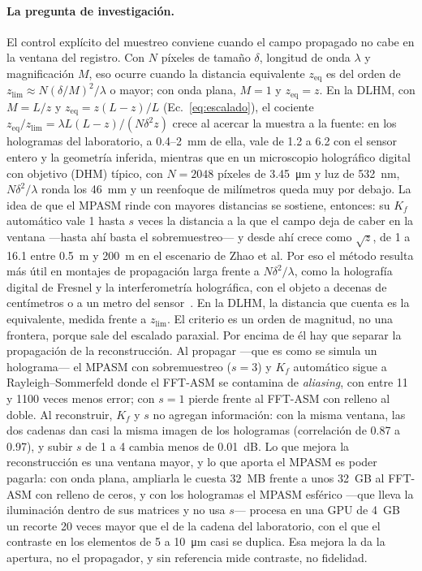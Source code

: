 \paragraph{La pregunta de investigación.} El control explícito del muestreo
conviene cuando el campo propagado no cabe en la ventana del registro. Con $N$
píxeles de tamaño $\delta$, longitud de onda $\lambda$ y magnificación $M$, eso
ocurre cuando la distancia equivalente $z_\mathrm{eq}$ es del orden de
$z_\mathrm{lim} \approx N(\delta/M)^2/\lambda$ o mayor; con onda plana, $M = 1$
y $z_\mathrm{eq} = z$. En la DLHM, con $M = L/z$ y $z_\mathrm{eq} = z(L-z)/L$
(Ec.~\eqref{eq:escalado}), el cociente
$z_\mathrm{eq}/z_\mathrm{lim} = \lambda L(L-z)/(N\delta^2 z)$ crece al acercar
la muestra a la fuente: en los hologramas del laboratorio, a 0.4--2~mm de ella,
vale de 1.2 a 6.2 con el sensor entero y la geometría inferida, mientras que en
un microscopio holográfico digital con objetivo (DHM) típico, con
$N = 2048$ píxeles de \SI{3.45}{\micro\metre} y luz de \SI{532}{nm},
$N\delta^2/\lambda$ ronda los 46~mm y un reenfoque de milímetros queda muy por
debajo. La idea de que el MPASM rinde con mayores distancias se
sostiene, entonces: su $K_f$ automático vale 1 hasta $s$ veces la distancia a
la que el campo deja de caber en la ventana ---hasta ahí basta el
sobremuestreo--- y desde ahí crece como $\sqrt{z}$, de 1 a 16.1 entre
\SI{0.5}{m} y
\SI{200}{m} en el escenario de Zhao et al. Por eso el método resulta más útil
en montajes de propagación larga frente a $N\delta^2/\lambda$, como la
holografía digital de Fresnel y la interferometría holográfica, con el objeto
a decenas de centímetros o a un metro del sensor~\cite{schnars1994,
schnars2005}. En la DLHM, la distancia que cuenta es la equivalente, medida
frente a $z_\mathrm{lim}$. El criterio es un orden de magnitud, no una frontera, porque sale del escalado
paraxial. Por encima de él hay que
separar la propagación de la reconstrucción. Al propagar ---que es como se
simula un holograma--- el MPASM con sobremuestreo ($s = 3$) y $K_f$ automático
sigue a Rayleigh--Sommerfeld donde el FFT-ASM se contamina de \emph{aliasing}, con
entre 11 y 1100 veces menos error; con $s = 1$ pierde frente al FFT-ASM con
relleno al doble. Al reconstruir, $K_f$ y $s$ no agregan información: con la
misma ventana, las dos cadenas dan casi la misma imagen de los hologramas
(correlación de 0.87 a 0.97), y subir $s$ de 1 a 4 cambia menos de 0.01~dB. Lo
que mejora la reconstrucción es una ventana mayor, y lo que aporta el MPASM es
poder pagarla: con onda plana, ampliarla le cuesta 32~MB frente a unos 32~GB al
FFT-ASM con relleno de ceros, y con los hologramas el MPASM esférico ---que
lleva la iluminación dentro de sus matrices y no usa $s$--- procesa en una GPU
de \SI{4}{GB} un recorte 20 veces mayor que el de la cadena del laboratorio,
con el que el contraste en los elementos de 5 a 10~\si{\micro\metre} casi se
duplica. Esa mejora la da la apertura, no el propagador, y sin referencia mide
contraste, no fidelidad.

